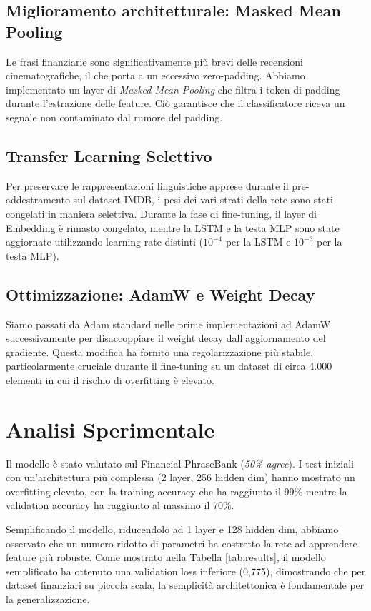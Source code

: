 \documentclass[conference]{IEEEtran}
\begin{document}
\subsection{Miglioramento architetturale: Masked Mean Pooling}
Le frasi finanziarie sono significativamente più brevi delle recensioni cinematografiche, il che porta a un eccessivo zero-padding. Abbiamo implementato un layer di \textit{Masked Mean Pooling} che filtra i token di padding durante l'estrazione delle feature. Ciò garantisce che il classificatore riceva un segnale non contaminato dal rumore del padding.

\subsection{Transfer Learning Selettivo}
Per preservare le rappresentazioni linguistiche apprese durante il pre-addestramento sul dataset IMDB, i pesi dei vari strati della rete sono stati congelati in maniera selettiva. Durante la fase di fine-tuning, il layer di Embedding è rimasto congelato, mentre la LSTM e la testa MLP sono state aggiornate utilizzando learning rate distinti ($10^{-4}$ per la LSTM e $10^{-3}$ per la testa MLP).

\subsection{Ottimizzazione: AdamW e Weight Decay}
Siamo passati da Adam standard nelle prime implementazioni ad AdamW successivamente per disaccoppiare il weight decay dall'aggiornamento del gradiente. Questa modifica ha fornito una regolarizzazione più stabile, particolarmente cruciale durante il fine-tuning su un dataset di circa 4.000 elementi in cui il rischio di overfitting è elevato.

\section{Analisi Sperimentale}
Il modello è stato valutato sul Financial PhraseBank (\textit{50\% agree}). I test iniziali con un'architettura più complessa (2 layer, 256 hidden dim) hanno mostrato un overfitting elevato, con la training accuracy che ha raggiunto il 99\% mentre la validation accuracy ha raggiunto al massimo il 70\%.

Semplificando il modello, riducendolo ad 1 layer e 128 hidden dim, abbiamo osservato che un numero ridotto di parametri ha costretto la rete ad apprendere feature più robuste. Come mostrato nella Tabella \ref{tab:results}, il modello semplificato ha ottenuto una validation loss inferiore (0,775), dimostrando che per dataset finanziari su piccola scala, la semplicità architettonica è fondamentale per la generalizzazione.
\end{document}
